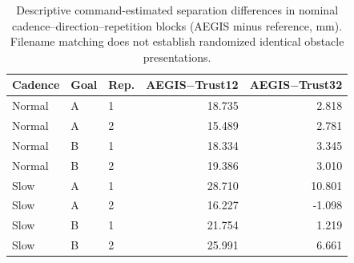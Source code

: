\begin{table}[H]
\centering\small
\caption{Descriptive command-estimated separation differences in nominal cadence--direction--repetition blocks (AEGIS minus reference, mm). Filename matching does not establish randomized identical obstacle presentations.}\label{tab:nominal-pairs}
\begin{tabular}{lllrr}
\toprule
Cadence & Goal & Rep. & AEGIS$-$Trust12 & AEGIS$-$Trust32\\
\midrule
Normal & A & 1 & 18.735 & 2.818\\
Normal & A & 2 & 15.489 & 2.781\\
Normal & B & 1 & 18.334 & 3.345\\
Normal & B & 2 & 19.386 & 3.010\\
Slow & A & 1 & 28.710 & 10.801\\
Slow & A & 2 & 16.227 & -1.098\\
Slow & B & 1 & 21.754 & 1.219\\
Slow & B & 2 & 25.991 & 6.661\\
\bottomrule
\end{tabular}
\end{table}
